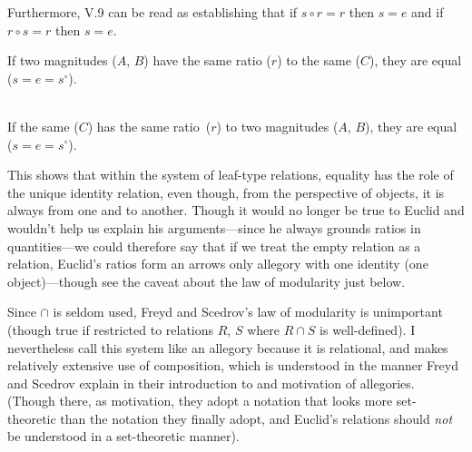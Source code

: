 \documentclass[11pt]{article}
\newcommand{\flushleftright}{\noindent\justifying}
\begin{document}
\begin{enumerate}
\flushleftright%
Furthermore, V.9 can be read as establishing that if \(s\circ r = r\) then \(s = e\) and if \(r \circ s = r\) then \(s = e\).

\centering%
\begin{tcolorbox}[%
	colbacktitle=white,
	coltitle = black,
	center title,
	halign upper=center,
	halign lower=center,
	fonttitle = \bfseries,
	colbacklower = white,
	colback = white,
	colframe=white,
	width = 0.95\linewidth,
	lower separated=false,
	sidebyside,
	boxrule=.2mm]
%

If two magnitudes ($A$, $B$) have the same ratio ($r$) to the same ($C$), they are equal ($s=e=s^{\circ}$).
\tcblower
\\
If the same ($C$) has the same ratio~($r$) to two magnitudes ($A$, $B$), they are equal ($s = e=s^{\circ}$).
\end{tcolorbox}

\flushleftright%
This shows that within the system of leaf-type relations, equality has the role of the unique identity relation, even though, from the perspective of objects, it is always from one and to another. Though it would no longer be true to Euclid and wouldn't help us explain his arguments---since he always grounds ratios in quantities---we could therefore say that if we treat the empty relation as a relation, Euclid's ratios form an arrows only allegory with one identity (one object)---though see the caveat about the law of modularity just below.
\end{enumerate}

Since $\cap$ is seldom used, Freyd and Scedrov's law of modularity is unimportant (though true if restricted to relations $R$, $S$ where $R \cap S$ is well-defined). I nevertheless call this system like an allegory because it is relational, and makes relatively extensive use of composition, which is understood in the manner Freyd and Scedrov explain in their introduction to and motivation of allegories. (Though there, as motivation, they adopt a notation that looks more set-theoretic than the notation they finally adopt, and Euclid's relations should \textit{not} be understood in a set-theoretic manner).
\end{document}
